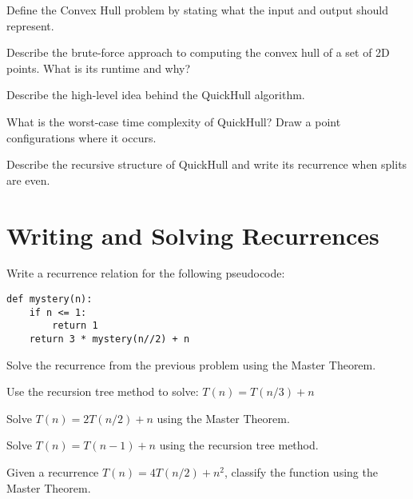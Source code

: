 \documentclass[12pt]{exam}
\begin{document}
\begin{questions}
\question[4] Define the Convex Hull problem by stating what the input and output should represent.

\vspace{1.2in}

\question[4] Describe the brute-force approach to computing the convex hull of a set of 2D points. What is its runtime and why?

\vspace{1.5in}

\question[4] Describe the high-level idea behind the QuickHull algorithm.

\vspace{1.2in}

\question[4] What is the worst-case time complexity of QuickHull? Draw a point configurations where it occurs.

\vspace{1.2in}


\question[4] Describe the recursive structure of QuickHull and write its recurrence when splits are even.

\vspace{1.5in}



\newpage
\section*{Writing and Solving Recurrences}

\question[4] Write a recurrence relation for the following pseudocode:

\begin{lstlisting}
def mystery(n):
    if n <= 1:
        return 1
    return 3 * mystery(n//2) + n
\end{lstlisting}

\vspace{1.2in}

\question[4] Solve the recurrence from the previous problem using the Master Theorem.

\vspace{1.2in}

\question[4] Use the recursion tree method to solve: \( T(n) = T(n/3) + n \)

\vspace{1.5in}

\question[4] Solve \( T(n) = 2T(n/2) + n \) using the Master Theorem.

\vspace{1.2in}

\question[4] Solve \( T(n) = T(n-1) + n \) using the recursion tree method.

\vspace{1.5in}

\question[4] Given a recurrence \( T(n) = 4T(n/2) + n^2 \), classify the function using the Master Theorem.

\vspace{1.2in}

\end{questions}
\end{document}
